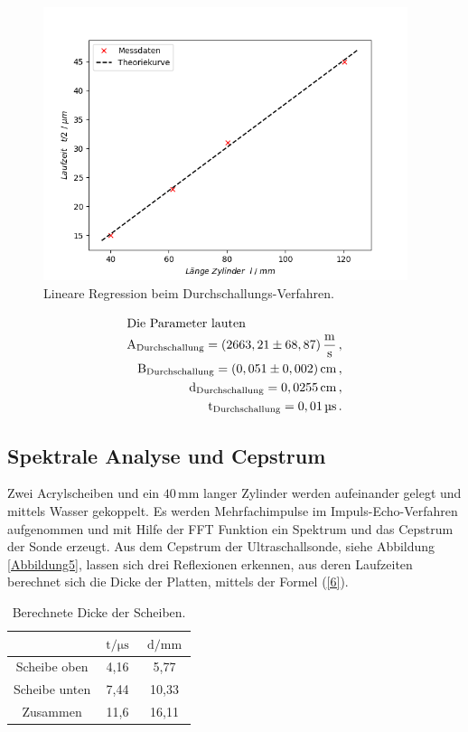 \begin{figure}[H]  
    \centering
    \includegraphics[height=80mm]{bilder/3.png}
    \caption{Lineare Regression beim Durchschallungs-Verfahren. \label{Abbildung4} }
\end{figure}

\begin{align*}
    \intertext{Die Parameter lauten}
    \text{A}_{\text{Durchschallung}} = (2663,21 \pm 68,87)\,\frac{\unit{\meter}}{\unit{\second}}\,, \\
    \text{B}_{\text{Durchschallung}} = (0,051 \pm 0,002)\,\unit{\centi\meter}\,, \\
    \text{d}_{\text{Durchschallung}} = 0,0255\,\unit{\centi\meter}\,, \\
    \text{t}_{\text{Durchschallung}} = 0,01\,\unit{\micro\second}\,.
\end{align*}

\subsection{Spektrale Analyse und Cepstrum}

\begin{flushleft}
    Zwei Acrylscheiben und ein $40\,\unit{\milli\meter}$ langer Zylinder werden aufeinander gelegt und mittels Wasser gekoppelt.
    Es werden Mehrfachimpulse im Impuls-Echo-Verfahren aufgenommen und mit Hilfe der FFT Funktion ein Spektrum und das Cepstrum der Sonde erzeugt.
    Aus dem Cepstrum der Ultraschallsonde, siehe Abbildung \ref{Abbildung5}, lassen sich drei Reflexionen erkennen, aus deren Laufzeiten berechnet sich die Dicke der Platten, mittels der Formel (\ref{6}).
\end{flushleft}

\begin{table}[H]
    \centering
    \caption{Berechnete Dicke der Scheiben.} 
    \label{Tabelle5}
    \begin{tabular} {c  c  c}
        \toprule
        {$  $} &
        {$ \text{t} \mathbin{/} \unit{\micro\second} $} &
        {$ \text{d} \mathbin{/} \unit{\milli\meter} $} \\
        \midrule
        Scheibe oben & 4,16 & 5,77 \\
        Scheibe unten & 7,44 & 10,33 \\
        Zusammen & 11,6 & 16,11 \\
        \bottomrule
    \end{tabular} 
\end{table}

